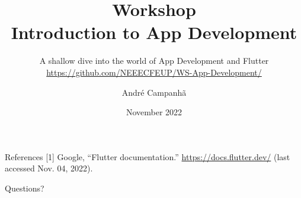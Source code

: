 \documentclass[10pt]{beamer}
\title{Workshop\\Introduction to App Development}
\subtitle{A shallow dive into the world of App Development and Flutter\texorpdfstring{\\ \footnotesize\url{https://github.com/NEEECFEUP/WS-App-Development/}}{}}
\institute{NEEEC - FEUP}
\date{November 2022}
\author{André Campanhã}
\begin{document}
\begin{frame}
  \maketitle
\end{frame}



\begin{frame}{References}
  [1] Google, “Flutter documentation.” \url{https://docs.flutter.dev/} (last accessed Nov. 04, 2022).
\end{frame}

{
  \begin{frame}[standout]
    Questions?
  \end{frame}
}
\end{document}
